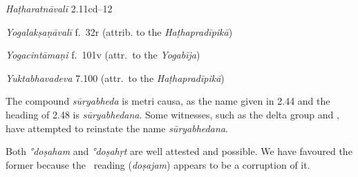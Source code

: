 \begin{ekdosis}
\begin{testimonia}[hp02_050]
\emph{Haṭharatnāvalī} 2.11cd–12

\begin{versinnote}
\tl{kapālaṃ ... śanaiḥ ] kapālaśodhanaṃ vātadoṣaghnaṃ kṛmināśanaṃ N,n1,n4.\\+}
\end{versinnote} 

\emph{Yogalakṣaṇāvalī} f.~32r (attrib. to the \emph{Haṭhapradīpikā})
\begin{versinnote}
\end{versinnote}

\emph{Yogacintāmaṇi} f.~101v (attr.~to the \emph{Yogabīja})
\begin{versinnote} 
\end{versinnote} 

\emph{Yuktabhavadeva} 7.100 (attr.~to the \emph{Haṭhapradīpikā})

\begin{versinnote}
\end{versinnote}

\end{testimonia}

\begin{philcomm}[hp02_050]
The compound \emph{sūryabheda} is metri causa, as the name given in 2.44 and the heading of 2.48 is \emph{sūryabhedana}. Some witnesses, such as the delta group and , have attempted to reinstate the name \emph{sūryabhedana}.

Both \emph{°doṣaham} and \emph{°doṣahṛt} are well attested and possible. We have favoured the former because the \textalpha\ reading (\emph{doṣajam}) appears to be a corruption of it.
\end{philcomm}


\end{ekdosis}
